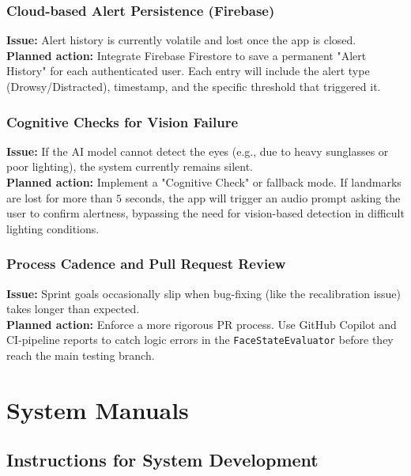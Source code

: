 \documentclass[11pt]{report}
\begin{document}
\subsection{Cloud-based Alert Persistence (Firebase)}
\textbf{Issue:} Alert history is currently volatile and lost once the app is closed.\\
\textbf{Planned action:} Integrate Firebase Firestore to save a permanent "Alert History" for each authenticated user. Each entry will include the alert type (Drowsy/Distracted), timestamp, and the specific threshold that triggered it.

\subsection{Cognitive Checks for Vision Failure}
\textbf{Issue:} If the AI model cannot detect the eyes (e.g., due to heavy sunglasses or poor lighting), the system currently remains silent.\\
\textbf{Planned action:} Implement a "Cognitive Check" or fallback mode. If landmarks are lost for more than $5$ seconds, the app will trigger an audio prompt asking the user to confirm alertness, bypassing the need for vision-based detection in difficult lighting conditions.

\subsection{Process Cadence and Pull Request Review}
\textbf{Issue:} Sprint goals occasionally slip when bug-fixing (like the recalibration issue) takes longer than expected.\\
\textbf{Planned action:} Enforce a more rigorous PR process. Use GitHub Copilot and CI-pipeline reports to catch logic errors in the \texttt{FaceStateEvaluator} before they reach the main testing branch.

\clearpage

\chapter{System Manuals}

\section{Instructions for System Development}
\end{document}
